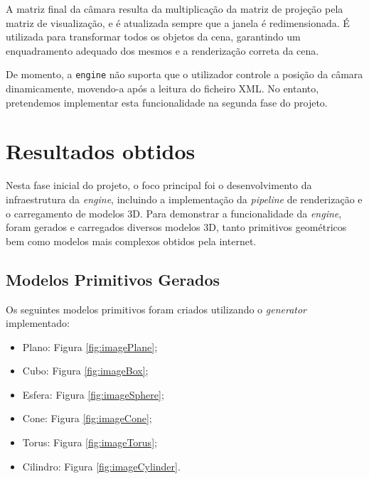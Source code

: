 \documentclass[12pt, a4paper]{article}
\begin{document}
A matriz final da câmara resulta da multiplicação da matriz de projeção pela matriz de visualização,
e é atualizada sempre que a janela é redimensionada. É utilizada para transformar todos os objetos
da cena, garantindo um enquadramento adequado dos mesmos e a renderização correta da cena.

De momento, a \texttt{engine} não suporta que o utilizador controle a posição da câmara
dinamicamente, movendo-a após a leitura do ficheiro XML. No entanto, pretendemos implementar esta
funcionalidade na segunda fase do projeto.

\section{Resultados obtidos}

Nesta fase inicial do projeto, o foco principal foi o desenvolvimento da infraestrutura da
\emph{engine}, incluindo a implementação da \emph{pipeline} de renderização e o carregamento de
modelos 3D. Para demonstrar a funcionalidade da \emph{engine}, foram gerados e carregados diversos
modelos 3D, tanto primitivos geométricos bem como modelos mais complexos obtidos pela internet.

\subsection{Modelos Primitivos Gerados}

Os seguintes modelos primitivos foram criados utilizando o \emph{generator} implementado:

\begin{itemize}
    \item Plano: Figura \ref{fig:imagePlane};
    \item Cubo: Figura \ref{fig:imageBox};
    \item Esfera: Figura \ref{fig:imageSphere};
    \item Cone: Figura \ref{fig:imageCone};
    \item Torus: Figura \ref{fig:imageTorus};
    \item Cilindro: Figura \ref{fig:imageCylinder}.
\end{itemize}
\end{document}
